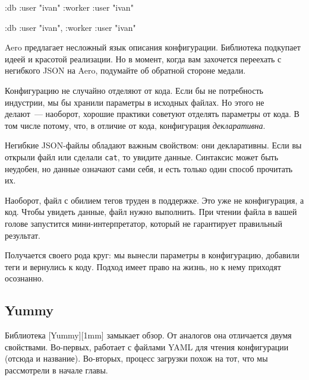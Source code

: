 \ifnarrow

\begin{english}
  \begin{clojure}
{:db {:user "ivan"}
 :worker {:user "ivan"}}
  \end{clojure}
\end{english}

\else

\begin{english}
  \begin{clojure}
{:db {:user "ivan"}, :worker {:user "ivan"}}
  \end{clojure}
\end{english}

\fi

Aero предлагает несложный язык описания конфигурации. Библиотека подкупает идеей
и красотой реализации. Но в момент, когда вам захочется переехать с негибкого
JSON на Aero, подумайте об обратной стороне медали.


Конфигурацию не случайно отделяют от кода. Если бы не потребность индустрии, мы
бы хранили параметры в исходных файлах. Но этого не делают~--- наоборот, хорошие
практики советуют отделять параметры от кода. В том числе потому, что, в
отличие от кода, конфигурация \emph{декларативна}.

Негибкие JSON-файлы обладают важным свойством: они декларативны. Если вы открыли
файл или сделали \verb|cat|, то увидите данные. Синтаксис может быть неудобен,
но данные означают сами себя, и есть только один способ прочитать их.

Наоборот, файл с обилием тегов труден в поддержке. Это уже не конфигурация, а
код. Чтобы увидеть данные, файл нужно выполнить. При чтении файла в вашей голове
запустится мини-интерпретатор, который не гарантирует правильный результат.

Получается своего рода круг: мы вынесли параметры в конфигурацию, добавили теги
и вернулись к коду. Подход имеет право на жизнь, но к нему приходят осознанно.

\subsection{Yummy}


Библиотека [Yummy][1mm] замыкает обзор. От
аналогов она отличается двумя свойствами. Во-первых, работает с файлами YAML для
чтения конфигурации (отсюда и название). Во-вторых, процесс загрузки похож на
тот, что мы рассмотрели в начале главы.

